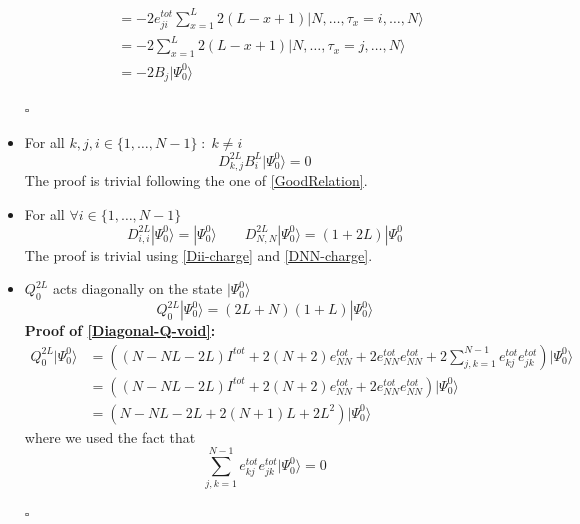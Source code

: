 \documentclass[10pt]{article}
\numberwithin{equation}{section}
\numberwithin{equation}{subsection}
\begin{document}
\begin{itemize}
\begin{align}
	\\&=
	-2e_{ji}^{tot}\sum_{x=1}^{L}2(L-x+1)|N,\ldots,\tau_{x}=i,\ldots,N\rangle\nonumber
	\\&=
	-2\sum_{x=1}^{L}2(L-x+1)|N,\ldots,\tau_{x}=j,\ldots,N\rangle\nonumber
	\\&=
	-2B_{j}|\Psi_{0}^{0}\rangle
\end{align}
\begin{flushright}
	$\square$
\end{flushright}
\item For all $k,j,i\in\{1,\ldots,N-1\}\;:\;k\neq i$
\begin{equation}\label{DijBk-different}
	D_{k,j}^{2L}B_{i}^{L}|\Psi_{0}^{0}\rangle=0
\end{equation}
The proof is trivial following the one of \eqref{GoodRelation}. 
\item For all $ \forall i\in \{1,\ldots,N-1\}$
\begin{equation}\label{Dii-ref}
	D_{i,i}^{2L}|\Psi_{0}^{0}\rangle=|\Psi_{0}^{0}\rangle\qquad D_{N,N}^{2L}|\Psi_{0}^{0}\rangle=(1+2L)|\Psi_{0}^{0}
\end{equation}
The proof is trivial using \eqref{Dii-charge} and \eqref{DNN-charge}. 
\item $Q_{0}^{2L}$ acts diagonally on the state $|\Psi_{0}^{0}\rangle$
\begin{equation}\label{Diagonal-Q-void}
	Q_{0}^{2L}|\Psi_{0}^{0}\rangle=(2L+N)(1+L)|\Psi_{0}^{0}\rangle
\end{equation}
\textbf{Proof of \eqref{Diagonal-Q-void}:}
\begin{align}
	Q_{0}^{2L}|\Psi_{0}^{0}\rangle&=\left((N-NL-2L)I^{tot}+2(N+2)e_{NN}^{tot}+2e_{NN}^{tot}e_{NN}^{tot}+2\sum_{j,k=1}^{N-1}e_{kj}^{tot}e_{jk}^{tot}\right)|\Psi_{0}^{0}\rangle\nonumber\\&=
	\left((N-NL-2L)I^{tot}+2(N+2)e_{NN}^{tot}+2e_{NN}^{tot}e_{NN}^{tot}\right)|\Psi_{0}^{0}\rangle\nonumber
	\\&=
	(N-NL-2L+2(N+1)L+2L^{2})|\Psi_{0}^{0}\rangle
\end{align}
where we used the fact that 
\begin{equation}
	\sum_{j,k=1}^{N-1}e_{kj}^{tot}e_{jk}^{tot}|\Psi_{0}^{0}\rangle=0
\end{equation}
\begin{flushright}
	$\square$
\end{flushright}
\end{itemize}
\end{document}
